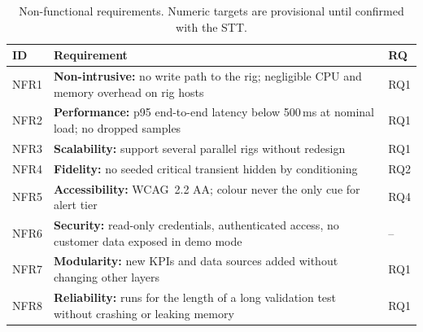 \begin{table}[H]
    \centering\small
    \caption{Non-functional requirements. Numeric targets are provisional until confirmed with the STT.}
    \label{tab:nfr}
    \begin{tabularx}{\textwidth}{lYl}
        \toprule
        ID   & Requirement                                                                                            & RQ  \\
        \midrule
        NFR1 & \textbf{Non-intrusive:} no write path to the rig; negligible CPU and memory overhead on rig hosts       & RQ1 \\
        NFR2 & \textbf{Performance:} p95 end-to-end latency below 500\,ms at nominal load; no dropped samples          & RQ1 \\
        NFR3 & \textbf{Scalability:} support several parallel rigs without redesign                                   & RQ1 \\
        NFR4 & \textbf{Fidelity:} no seeded critical transient hidden by conditioning                                 & RQ2 \\
        NFR5 & \textbf{Accessibility:} WCAG~2.2 AA; colour never the only cue for alert tier                          & RQ4 \\
        NFR6 & \textbf{Security:} read-only credentials, authenticated access, no customer data exposed in demo mode   & --  \\
        NFR7 & \textbf{Modularity:} new KPIs and data sources added without changing other layers                     & RQ1 \\
        NFR8 & \textbf{Reliability:} runs for the length of a long validation test without crashing or leaking memory & RQ1 \\
        \bottomrule
    \end{tabularx}
\end{table}


